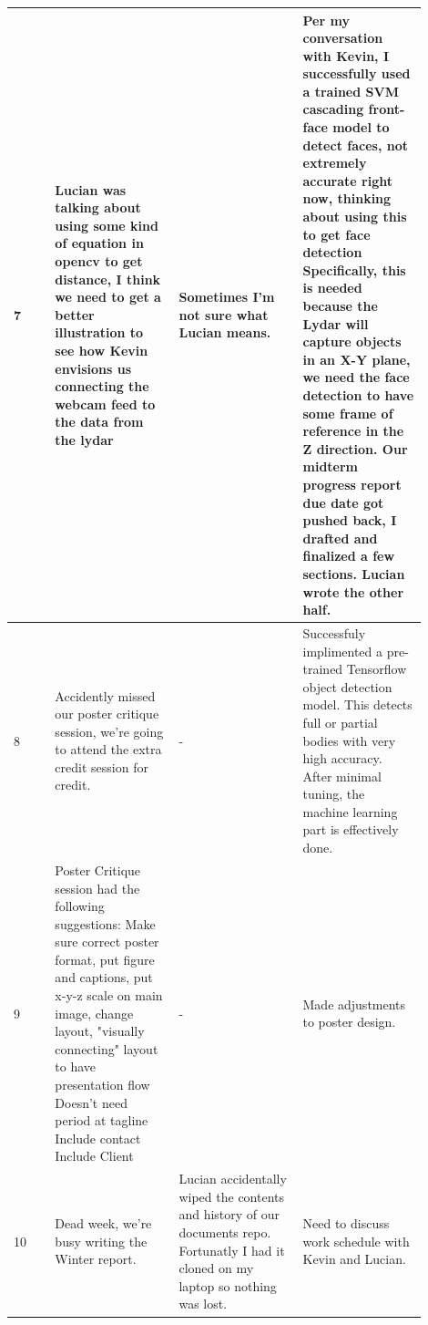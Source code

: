\documentclass[onecolumn, draftclsnofoot,10pt, compsoc]{IEEEtran}
\begin{document}
\begin{singlespace}
\begin{longtable}{|l|p{0.3\linewidth}|p{0.3\linewidth}|p{0.3\linewidth}|}
		7	&
			Lucian was talking about using some kind of equation in opencv to get distance, I think we need to get a better illustration to see how Kevin envisions us connecting the webcam feed to the data from the lydar
			&
			Sometimes I'm not sure what Lucian means.
			&
			Per my conversation with Kevin, I successfully used a trained SVM cascading front-face model to detect faces, not extremely accurate right now, thinking about using this to get face detection
			Specifically, this is needed because the Lydar will capture objects in an X-Y plane, we need the face detection to have some frame of reference in the Z direction.
			Our midterm progress report due date got pushed back, I drafted and finalized a few sections.
			Lucian wrote the other half.
			\\\hline

		8	&
			Accidently missed our poster critique session, we're going to attend the extra credit session for credit.
			&
			-
			&
			Successfuly implimented a pre-trained Tensorflow object detection model.
			This detects full or partial bodies with very high accuracy.
			After minimal tuning, the machine learning part is effectively done.
			\\\hline

		9	&
			Poster Critique session had the following suggestions: Make sure correct poster format, put figure and captions, put x-y-z scale on main image, change layout, "visually connecting" layout to have presentation flow
			Doesn’t need period at tagline
			Include contact
			Include Client
			&
			-
			&
			Made adjustments to poster design.
			\\\hline

		10	&
			Dead week, we're busy writing the Winter report.
			&
			Lucian accidentally wiped the contents and history of our documents repo.
			Fortunatly I had it cloned on my laptop so nothing was lost.
			&
			Need to discuss work schedule with Kevin and Lucian.
			\\\hline
		\end{longtable}


\end{singlespace}
\end{document}
